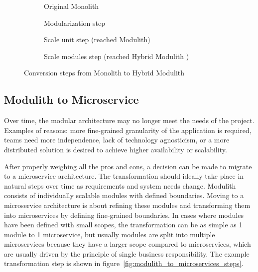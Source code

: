 \begin{figure}
    \centering
    \begin{subfigure}{.5\textwidth}
        \centering
        
        \caption{Original Monolith}
    \end{subfigure}%
    \begin{subfigure}{.5\textwidth}
        \centering
        
        \caption{Modularization step}
    \end{subfigure}
    \begin{subfigure}{\textwidth}
        \centering
        
        \caption{Scale unit step (reached Modulith)\label{fig:scale_as_unit}}
    \end{subfigure}%
    \hfill
    \begin{subfigure}{\textwidth}
        \centering
        
        \caption{Scale modules step (reached Hybrid Modulith \label{fig:hybrid_modulith})}
    \end{subfigure}
    \caption{Conversion steps from Monolith to Hybrid Modulith}
    \label{fig:monolith_to_modulith_steps}
\end{figure}


\subsection{Modulith to Microservice}
\label{subsection:modulith_to_microservices}
Over time, the modular architecture may no longer meet the needs of the project. Examples of reasons: more fine-grained granularity of the application is required, teams need more independence, lack of technology agnosticism, or a more distributed solution is desired to achieve higher availability or scalability.

After properly weighing all the pros and cons, a decision can be made to migrate to a microservice architecture. The transformation should ideally take place in natural steps over time as requirements and system needs change. Modulith consists of individually scalable modules with defined boundaries. Moving to a microservice architecture is about refining these modules and transforming them into microservices by defining fine-grained boundaries. In cases where modules have been defined with small scopes, the transformation can be as simple as 1 module to 1 microservice, but usually modules are split into multiple microservices because they have a larger scope compared to microservices, which are usually driven by the principle of single business responsibility. The example transformation step is shown in figure~\ref{fig:modulith_to_microservices_steps}.

